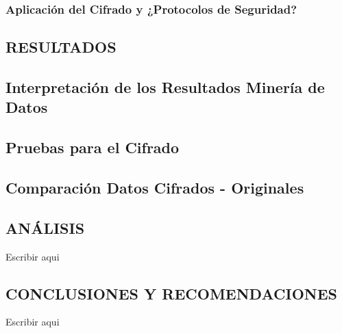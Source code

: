 \documentclass[a4paper,openright,12pt]{book}
\theoremstyle{definition}
\theoremstyle{remark}
\begin{document}
        
        
        
        
        \subsection{Aplicación del Cifrado y ¿Protocolos de Seguridad?}
\clearpage

\begin{center}
 \chapter{RESULTADOS}\label{cap.resultados}
\end{center}
\section{Interpretación de los Resultados Minería de Datos}
\section{Pruebas para el Cifrado}
\section{Comparación Datos Cifrados - Originales}
\clearpage

\begin{center}
 \chapter{ANÁLISIS}\label{cap.analisis}
\end{center}
Escribir aqui
\clearpage

\begin{center}
 \chapter{CONCLUSIONES Y RECOMENDACIONES}\label{cap.conclusiones}
\end{center}
Escribir aqui
\clearpage
\end{document}
